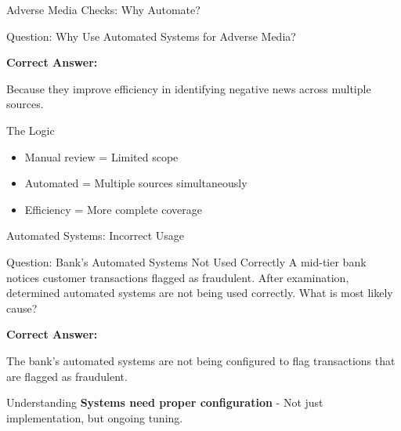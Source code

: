\documentclass{beamer}
\begin{document}
\begin{frame}{Adverse Media Checks: Why Automate?}
\begin{block}{Question: Why Use Automated Systems for Adverse Media?}
\end{block}

\vspace{0.3cm}
\textcolor{correct}{\textbf{Correct Answer:}}
\begin{center}
\Large{Because they improve efficiency in identifying negative news across multiple sources.}
\end{center}

\begin{block}{The Logic}
\begin{itemize}
    \item Manual review = Limited scope
    \item Automated = Multiple sources simultaneously
    \item Efficiency = More complete coverage
\end{itemize}
\end{block}
\end{frame}

\begin{frame}{Automated Systems: Incorrect Usage}
\begin{block}{Question: Bank's Automated Systems Not Used Correctly}
\small{A mid-tier bank notices customer transactions flagged as fraudulent. After examination, determined automated systems are not being used correctly. What is most likely cause?}
\end{block}

\vspace{0.3cm}
\textcolor{correct}{\textbf{Correct Answer:}}
\begin{center}
\Large{The bank's automated systems are not being configured to flag transactions that are flagged as fraudulent.}
\end{center}

\begin{block}{Understanding}
\textbf{Systems need proper configuration} - Not just implementation, but ongoing tuning.
\end{block}
\end{frame}

\end{document}
